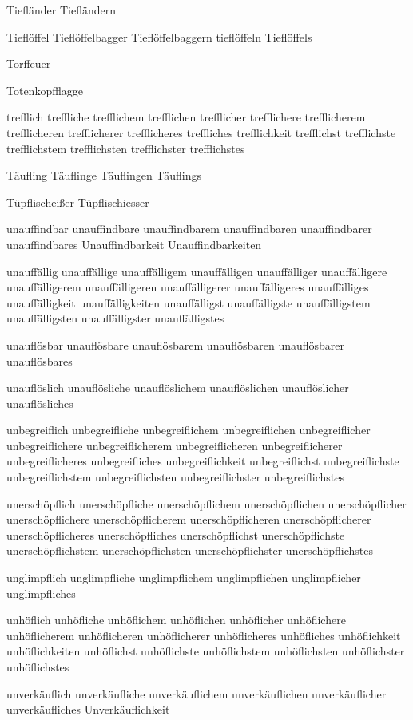 Tiefländer Tiefländern

Tieflöffel Tieflöffelbagger Tieflöffelbaggern tieflöffeln Tieflöffels

Torffeuer

Totenkopfflagge

trefflich treffliche trefflichem trefflichen trefflicher trefflichere trefflicherem trefflicheren trefflicherer trefflicheres treffliches trefflichkeit trefflichst trefflichste trefflichstem trefflichsten trefflichster trefflichstes

Täufling Täuflinge Täuflingen Täuflings

Tüpflischeißer Tüpflischiesser

unauffindbar unauffindbare unauffindbarem unauffindbaren unauffindbarer unauffindbares Unauffindbarkeit Unauffindbarkeiten

unauffällig unauffällige unauffälligem unauffälligen unauffälliger unauffälligere unauffälligerem unauffälligeren unauffälligerer unauffälligeres unauffälliges unauffälligkeit unauffälligkeiten unauffälligst unauffälligste unauffälligstem unauffälligsten unauffälligster unauffälligstes

unauflösbar unauflösbare unauflösbarem unauflösbaren unauflösbarer unauflösbares

unauflöslich unauflösliche unauflöslichem unauflöslichen unauflöslicher unauflösliches

unbegreiflich unbegreifliche unbegreiflichem unbegreiflichen unbegreiflicher unbegreiflichere unbegreiflicherem unbegreiflicheren unbegreiflicherer unbegreiflicheres unbegreifliches unbegreiflichkeit unbegreiflichst unbegreiflichste unbegreiflichstem unbegreiflichsten unbegreiflichster unbegreiflichstes

unerschöpflich unerschöpfliche unerschöpflichem unerschöpflichen unerschöpflicher unerschöpflichere unerschöpflicherem unerschöpflicheren unerschöpflicherer unerschöpflicheres unerschöpfliches unerschöpflichst unerschöpflichste unerschöpflichstem unerschöpflichsten unerschöpflichster unerschöpflichstes

unglimpflich unglimpfliche unglimpflichem unglimpflichen unglimpflicher unglimpfliches

unhöflich unhöfliche unhöflichem unhöflichen unhöflicher unhöflichere unhöflicherem unhöflicheren unhöflicherer unhöflicheres unhöfliches unhöflichkeit unhöflichkeiten unhöflichst unhöflichste unhöflichstem unhöflichsten unhöflichster unhöflichstes

unverkäuflich unverkäufliche unverkäuflichem unverkäuflichen unverkäuflicher unverkäufliches Unverkäuflichkeit

